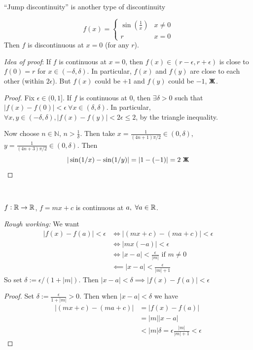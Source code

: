 \documentclass[twoside]{scrartcl}
\newcommand*{\cont}{%
  \mathsf{X}\mkern-8.5mu\mathsf{X}%
}
\begin{document}
``Jump discontinuity'' is another type of discontinuity\\


\begin{example}
\[f(x) = \begin{cases}
 \sin(\frac{1}{x}) & x \neq 0\\
 r & x = 0	
 \end{cases}
\] Then $f$ is discontinuous at $x = 0$ (for any $r$).	

\begin{center}
\end{center}

\emph{Idea of proof}: If $f$ is continuous at $x = 0$, then $f(x) \in (r-\epsilon, r + \epsilon)$ is close to $f(0) = r$ for $x \in (- \delta, \delta).$ In particular, $f(x)$ and $f(y)$ are close to each other (within $2\epsilon$). But $f(x)$ could be $+1$ and $f(y)$ could be $-1$, $\cont$.
\begin{proof}
Fix $\epsilon \in (0,1]$. If $f$ is continuous at $0$, then $\exists \delta > 0$ such that $|f(x) - f(0)| < \epsilon~\forall x \in (\delta,\delta)$. In particular, $\forall x,y \in (-\delta, \delta), |f(x) - f(y)| < 2\epsilon \leq 2$, by the triangle inequality. 

Now choose $n \in \mathbb{N}$, $n > \frac{1}{\delta}$. Then take $x = \frac{1}{(4n+1)\pi/2} \in (0,\delta)$, $y = \frac{1}{(4n+3)\pi/2} \in (0,\delta)$. Then 
\[|\sin(1/x) - \sin(1/y)| = |1 - (-1)| = 2 ~\cont\qedhere\]
\end{proof}

\end{example}~


\begin{example}
$f: \mathbb{R} \to \mathbb{R}$, $f = mx + c$ is continuous at $a, ~\forall a \in\mathbb{R}$. 

\emph{Rough working:} We want 
\[\begin{aligned}|f(x) - f(a)| < \epsilon &\iff |(mx+c) - (ma + c)|  < \epsilon \\
&\iff |mx(-a)| < \epsilon\\
&\iff |x-a| < \frac{\epsilon}{|m|} \text{ if } m \neq 0 \\
&\impliedby |x-a| < \frac{\epsilon}{|m|+1} 
\end{aligned}
\]
So set $\delta:= \epsilon / (1 + |m|)$. Then $|x-a| < \delta \implies |f(x) - f(a)| < \epsilon$
\begin{proof}
Set $\delta:= \frac{\epsilon }{1 + |m|} > 0$. Then when $|x-a| < \delta$ we have  
\[\begin{aligned}
|(mx+ c) - (ma +c)| &= |f(x) - f(a)| \\
&= |m||x-a| \\
&< |m|\delta = \epsilon \frac{|m|}{|m|+1} < \epsilon	
\end{aligned}\]
\end{proof}
\end{example}
\end{document}
